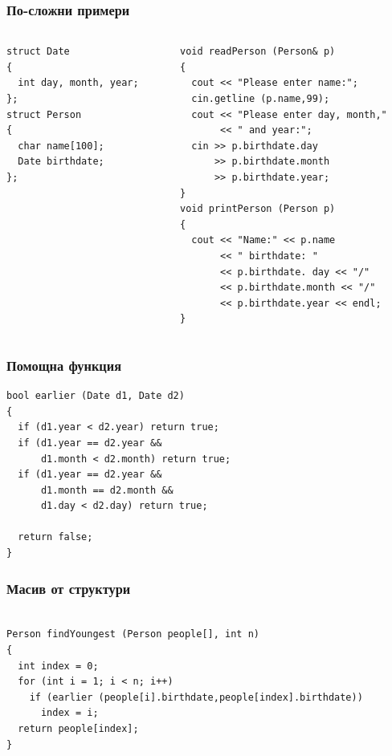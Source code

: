 \documentclass{beamer}
\begin{document}
\begin{frame}[fragile]
\frametitle{По-сложни примери}

\begin{columns}[t]
  \begin{column}{0.4\textwidth}

\begin{lstlisting}
struct Date
{
  int day, month, year;
};
struct Person
{
  char name[100];
  Date birthdate;
};
\end{lstlisting}

  \end{column}
  \begin{column}{0.6\textwidth}
\pause
{}
\begin{lstlisting}
void readPerson (Person& p)
{
  cout << "Please enter name:";
  cin.getline (p.name,99);
  cout << "Please enter day, month,"
       << " and year:";
  cin >> p.birthdate.day
      >> p.birthdate.month
      >> p.birthdate.year;
}
void printPerson (Person p)
{
  cout << "Name:" << p.name
       << " birthdate: "
       << p.birthdate. day << "/"
       << p.birthdate.month << "/"
       << p.birthdate.year << endl;
}

\end{lstlisting}
  \end{column}
\end{columns}



\end{frame}


\begin{frame}[fragile]
\frametitle{Помощна функция}

\begin{lstlisting}
bool earlier (Date d1, Date d2)
{
  if (d1.year < d2.year) return true;
  if (d1.year == d2.year &&
      d1.month < d2.month) return true;
  if (d1.year == d2.year &&
      d1.month == d2.month &&
      d1.day < d2.day) return true;

  return false;
}

\end{lstlisting}

\end{frame}


\begin{frame}[fragile]
\frametitle{Масив от структури}

\begin{lstlisting}

Person findYoungest (Person people[], int n)
{
  int index = 0;
  for (int i = 1; i < n; i++)
    if (earlier (people[i].birthdate,people[index].birthdate))
      index = i;
  return people[index];
}


\end{lstlisting}

\end{frame}
\end{document}
